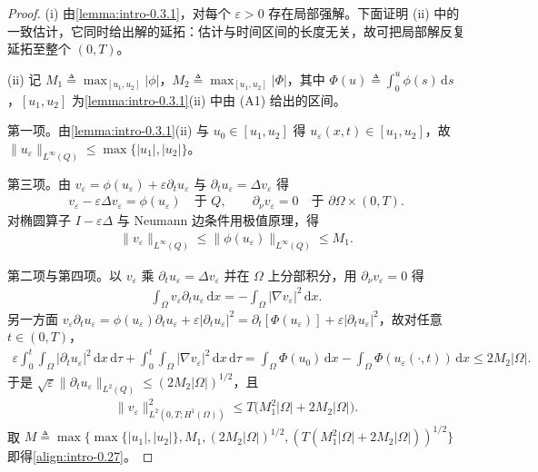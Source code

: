 \documentclass[../main.tex]{subfiles}
\begin{document}
\begin{proof}
(i) 由\cref{lemma:intro-0.3.1}，对每个 $\varepsilon>0$ 存在局部强解。下面证明 (ii) 中的一致估计，它同时给出解的延拓：估计与时间区间的长度无关，故可把局部解反复延拓至整个 $(0,T)$。

(ii) 记 $M_1\triangleq\max_{[u_1,u_2]}|\phi|$，$M_2\triangleq\max_{[u_1,u_2]}|\Phi|$，其中 $\Phi(u)\triangleq\int_0^u\phi(s)\,\mathrm{d}s$，$[u_1,u_2]$ 为\cref{lemma:intro-0.3.1}(ii) 中由 (A1) 给出的区间。

第一项。由\cref{lemma:intro-0.3.1}(ii) 与 $u_0\in[u_1,u_2]$ 得 $u_\varepsilon(x,t)\in[u_1,u_2]$，故 $\|u_\varepsilon\|_{L^\infty(Q)}\leqslant\max\{|u_1|,|u_2|\}$。

第三项。由 $v_\varepsilon=\phi(u_\varepsilon)+\varepsilon\partial_t u_\varepsilon$ 与 $\partial_t u_\varepsilon=\Delta v_\varepsilon$ 得
\begin{align*}
v_\varepsilon-\varepsilon\Delta v_\varepsilon=\phi(u_\varepsilon)\quad\text{于 }Q,
\qquad
\partial_\nu v_\varepsilon=0\quad\text{于 }\partial\Omega\times(0,T).
\end{align*}
对椭圆算子 $I-\varepsilon\Delta$ 与 Neumann 边条件用极值原理，得
\begin{align*}
\|v_\varepsilon\|_{L^\infty(Q)}\leqslant\|\phi(u_\varepsilon)\|_{L^\infty(Q)}\leqslant M_1 .
\end{align*}

第二项与第四项。以 $v_\varepsilon$ 乘 $\partial_t u_\varepsilon=\Delta v_\varepsilon$ 并在 $\Omega$ 上分部积分，用 $\partial_\nu v_\varepsilon=0$ 得
\begin{align*}
\int_\Omega v_\varepsilon\partial_t u_\varepsilon\,\mathrm{d}x=-\int_\Omega|\nabla v_\varepsilon|^2\,\mathrm{d}x .
\end{align*}
另一方面 $v_\varepsilon\partial_t u_\varepsilon=\phi(u_\varepsilon)\partial_t u_\varepsilon+\varepsilon|\partial_t u_\varepsilon|^2=\partial_t[\Phi(u_\varepsilon)]+\varepsilon|\partial_t u_\varepsilon|^2$，故对任意 $t\in(0,T)$，
\begin{align*}
\varepsilon\int_0^t\!\!\int_\Omega|\partial_t u_\varepsilon|^2\,\mathrm{d}x\,\mathrm{d}\tau
+\int_0^t\!\!\int_\Omega|\nabla v_\varepsilon|^2\,\mathrm{d}x\,\mathrm{d}\tau
=\int_\Omega\Phi(u_0)\,\mathrm{d}x-\int_\Omega\Phi(u_\varepsilon(\cdot,t))\,\mathrm{d}x
\leqslant 2M_2|\Omega| .
\end{align*}
于是 $\sqrt{\varepsilon}\|\partial_t u_\varepsilon\|_{L^2(Q)}\leqslant(2M_2|\Omega|)^{1/2}$，且
\begin{align*}
\|v_\varepsilon\|_{L^2(0,T;H^1(\Omega))}^2
\leqslant T\bigl(M_1^2|\Omega|+2M_2|\Omega|\bigr).
\end{align*}
取 $M\triangleq\max\{\max\{|u_1|,|u_2|\},M_1,(2M_2|\Omega|)^{1/2},(T(M_1^2|\Omega|+2M_2|\Omega|))^{1/2}\}$ 即得\eqref{align:intro-0.27}。
\end{proof}
\end{document}
